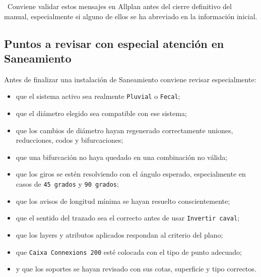 \pendingtag\ Conviene validar estos mensajes en Allplan antes del cierre definitivo del manual, especialmente si alguno de ellos se ha abreviado en la información inicial.

\subsection{Puntos a revisar con especial atención en Saneamiento}

Antes de finalizar una instalación de Saneamiento conviene revisar especialmente:

\begin{itemize}
\item que el sistema activo sea realmente \texttt{Pluvial} o \texttt{Fecal};
\item que el diámetro elegido sea compatible con ese sistema;
\item que los cambios de diámetro hayan regenerado correctamente uniones, reducciones, codos y bifurcaciones;
\item que una bifurcación no haya quedado en una combinación no válida;
\item que los giros se estén resolviendo con el ángulo esperado, especialmente en casos de \texttt{45 grados} y \texttt{90 grados};
\item que los avisos de longitud mínima se hayan resuelto conscientemente;
\item que el sentido del trazado sea el correcto antes de usar \texttt{Invertir caval};
\item que los layers y atributos aplicados respondan al criterio del plano;
\item que \texttt{Caixa Connexions 200} esté colocada con el tipo de punto adecuado;
\item y que los soportes se hayan revisado con sus cotas, superficie y tipo correctos.
\end{itemize}

